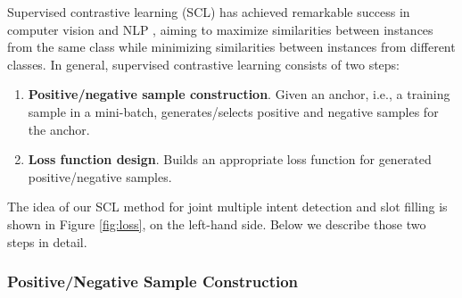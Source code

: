 \documentclass{ecai}
\begin{document}
Supervised contrastive learning (SCL) has achieved remarkable success in computer vision and NLP \cite{khosla:2020,zhang:2022,ZhangNAACL:2022,Rethmeier:2023}, aiming to maximize similarities between instances from the same class while minimizing similarities between instances from different classes. In general, supervised contrastive learning consists of two steps:
\begin{enumerate}
    \item \textbf{Positive/negative sample construction}. Given an anchor, i.e., a training sample in a mini-batch, generates/selects positive and negative samples for the anchor.
    \item \textbf{Loss function design}. Builds an appropriate loss function for generated positive/negative samples.  
\end{enumerate}

The idea of our SCL method for joint multiple intent detection and slot filling is shown in Figure \ref{fig:loss}, on the left-hand side. Below we describe those two steps in detail.  

\subsubsection{Positive/Negative Sample Construction}
\end{document}
